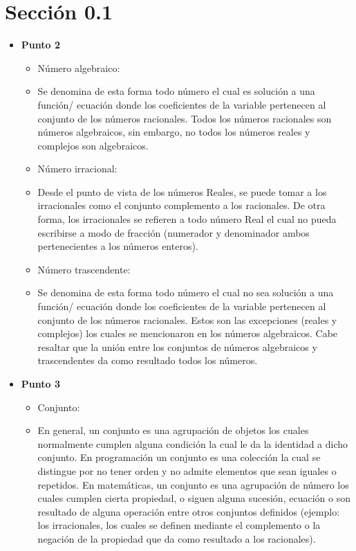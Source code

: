 \documentclass{article}
\begin{document}
\section{Sección 0.1}
\begin{itemize}
	\item[] \textbf{Punto 2}
		\begin{itemize}
			\item Número algebraico:
			\item[] Se denomina de esta forma todo número el cual es solución a una función/ ecuación donde los coeficientes de la variable pertenecen al conjunto de los números racionales. Todos los números racionales son números algebraicos, sin embargo, no todos los números reales y complejos son algebraicos.
			\item Número irracional:
			\item[] Desde el punto de vista de los números Reales, se puede tomar a los irracionales como el conjunto complemento a los racionales. De otra forma, los irracionales se refieren a todo número Real el cual no pueda escribirse a modo de fracción (numerador y denominador ambos pertenecientes a los números enteros).
			\item Número trascendente:
			\item[] Se denomina de esta forma todo número el cual no sea solución a una función/ ecuación donde los coeficientes de la variable pertenecen al conjunto de los números racionales. Estos son las excepciones (reales y complejos) los cuales se mencionaron en los números algebraicos. Cabe resaltar que la unión entre los conjuntos de números algebraicos y trascendentes da como resultado todos los números.
		\end{itemize}
	\item[] \textbf{Punto 3}
		\begin{itemize}
			\item Conjunto:
			\item [] En general, un conjunto es una agrupación de objetos los cuales normalmente cumplen alguna condición la cual le da la identidad a dicho conjunto. En programación un conjunto es una colección la cual se distingue por no tener orden y no admite elementos que sean iguales o repetidos. En matemáticas, un conjunto es una agrupación de número los cuales cumplen cierta propiedad, o siguen alguna sucesión, ecuación o son resultado de alguna operación entre otros conjuntos definidos (ejemplo: los irracionales, los cuales se definen mediante el complemento o la negación de la propiedad que da como resultado a los racionales).

\end{itemize}
\end{itemize}
\end{document}
